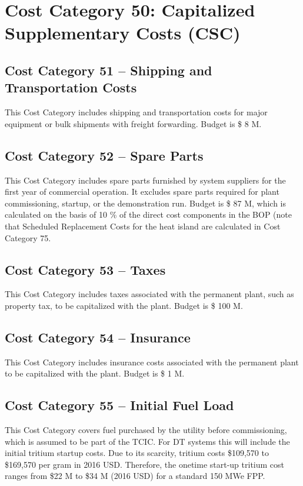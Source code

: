 \section{Cost Category 50: Capitalized Supplementary Costs (CSC)}


\subsection*{Cost Category 51 – Shipping and Transportation Costs}
This Cost Category includes shipping and transportation costs for major equipment or bulk shipments with freight forwarding. Budget is \$ 8 M.

\subsection*{Cost Category 52 – Spare Parts}
This Cost Category includes spare parts furnished by system suppliers for the first year of commercial operation. It excludes spare parts required for plant commissioning, startup, or the demonstration run.  Budget is \$ 87 M, which is calculated on the basis of 10 \% of the direct cost components in the BOP (note that Scheduled Replacement Costs for the heat island are calculated in Cost Category 75.

\subsection*{Cost Category 53 – Taxes}
This Cost Category includes taxes associated with the permanent plant, such as property tax, to be capitalized with the plant. Budget is \$ 100 M.

\subsection*{Cost Category 54 – Insurance}
This Cost Category includes insurance costs associated with the permanent plant to be capitalized with the plant.  Budget is \$ 1 M.

\subsection*{Cost Category 55 – Initial Fuel Load}
This Cost Category covers fuel purchased by the utility before commissioning, which is assumed to be part of the TCIC. For DT systems this will include the initial tritium startup costs.  Due to its scarcity, tritium costs \$109,570 to \$169,570 per gram in 2016 USD. Therefore, the onetime start-up tritium cost ranges from \$22 M to \$34 M (2016 USD) for a standard 150 MWe FPP. \\


